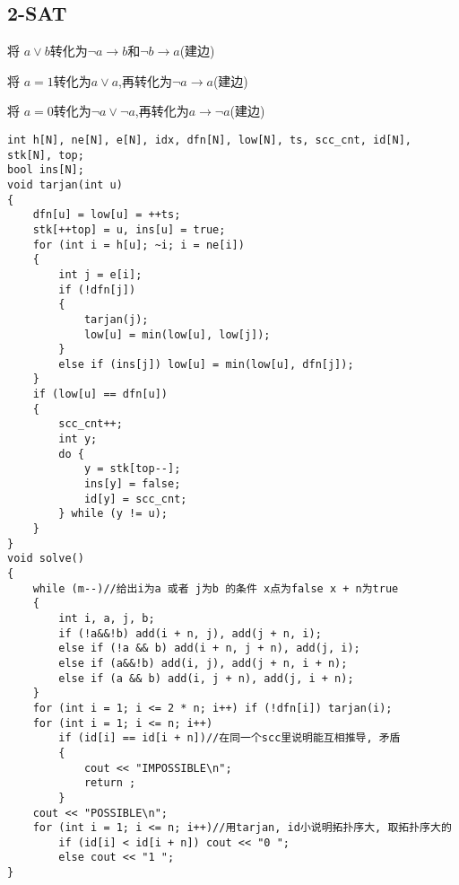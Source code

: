 \documentclass[a4paper, fontset=none]{ctexart}
\begin{document}
\subsection{2-SAT}

将 $a\lor b$转化为$\neg a\rightarrow b$和$\neg b\rightarrow a$(建边)

将 $a=1$转化为$a\lor a$,再转化为$\neg a\rightarrow a$(建边)

将 $a=0$转化为$\neg a \lor \neg a$,再转化为$a\rightarrow \neg a$(建边)

\begin{verbatim}
int h[N], ne[N], e[N], idx, dfn[N], low[N], ts, scc_cnt, id[N], stk[N], top;
bool ins[N];
void tarjan(int u)
{
    dfn[u] = low[u] = ++ts;
    stk[++top] = u, ins[u] = true;
    for (int i = h[u]; ~i; i = ne[i])
    {
        int j = e[i];
        if (!dfn[j])
        {
            tarjan(j);
            low[u] = min(low[u], low[j]);
        }
        else if (ins[j]) low[u] = min(low[u], dfn[j]);
    }
    if (low[u] == dfn[u])
    {
        scc_cnt++;
        int y;
        do {
            y = stk[top--];
            ins[y] = false;
            id[y] = scc_cnt;
        } while (y != u);
    }
}
void solve()
{
    while (m--)//给出i为a 或者 j为b 的条件 x点为false x + n为true
    {
        int i, a, j, b;
        if (!a&&!b) add(i + n, j), add(j + n, i);
        else if (!a && b) add(i + n, j + n), add(j, i);
        else if (a&&!b) add(i, j), add(j + n, i + n);
        else if (a && b) add(i, j + n), add(j, i + n);
    }
    for (int i = 1; i <= 2 * n; i++) if (!dfn[i]) tarjan(i);
    for (int i = 1; i <= n; i++)
        if (id[i] == id[i + n])//在同一个scc里说明能互相推导, 矛盾
        {
            cout << "IMPOSSIBLE\n";
            return ;
        }
    cout << "POSSIBLE\n";
    for (int i = 1; i <= n; i++)//用tarjan, id小说明拓扑序大, 取拓扑序大的
        if (id[i] < id[i + n]) cout << "0 ";
        else cout << "1 ";
}
\end{verbatim}
\end{document}
